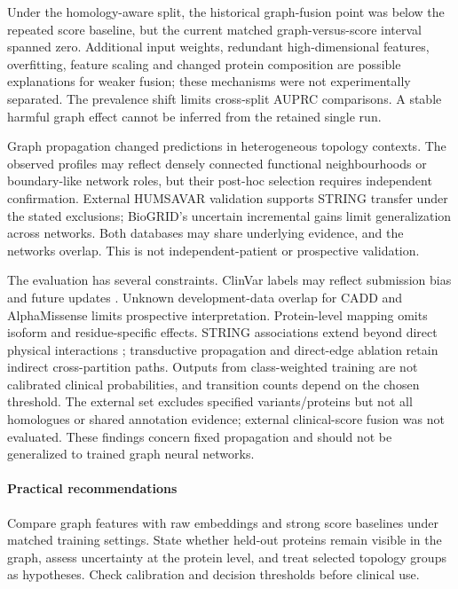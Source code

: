 \documentclass[conference]{IEEEtran}
\begin{document}
Under the homology-aware split, the historical graph-fusion point was below the repeated score baseline, but the current matched graph-versus-score interval spanned zero. Additional input weights, redundant high-dimensional features, overfitting, feature scaling and changed protein composition are possible explanations for weaker fusion; these mechanisms were not experimentally separated. The prevalence shift limits cross-split AUPRC comparisons. A stable harmful graph effect cannot be inferred from the retained single run.

Graph propagation changed predictions in heterogeneous topology contexts. The observed profiles may reflect densely connected functional neighbourhoods or boundary-like network roles, but their post-hoc selection requires independent confirmation. External HUMSAVAR validation supports STRING transfer under the stated exclusions; BioGRID's uncertain incremental gains limit generalization across networks. Both databases may share underlying evidence, and the networks overlap. This is not independent-patient or prospective validation.

The evaluation has several constraints. ClinVar labels may reflect submission bias and future updates \cite{Landrum2020ClinVar}. Unknown development-data overlap for CADD and AlphaMissense limits prospective interpretation. Protein-level mapping omits isoform and residue-specific effects. STRING associations extend beyond direct physical interactions \cite{Szklarczyk2023STRING}; transductive propagation and direct-edge ablation retain indirect cross-partition paths. Outputs from class-weighted training are not calibrated clinical probabilities, and transition counts depend on the chosen threshold. The external set excludes specified variants/proteins but not all homologues or shared annotation evidence; external clinical-score fusion was not evaluated. These findings concern fixed propagation and should not be generalized to trained graph neural networks.

\paragraph{Practical recommendations}
Compare graph features with raw embeddings and strong score baselines under matched training settings. State whether held-out proteins remain visible in the graph, assess uncertainty at the protein level, and treat selected topology groups as hypotheses. Check calibration and decision thresholds before clinical use.
\end{document}
